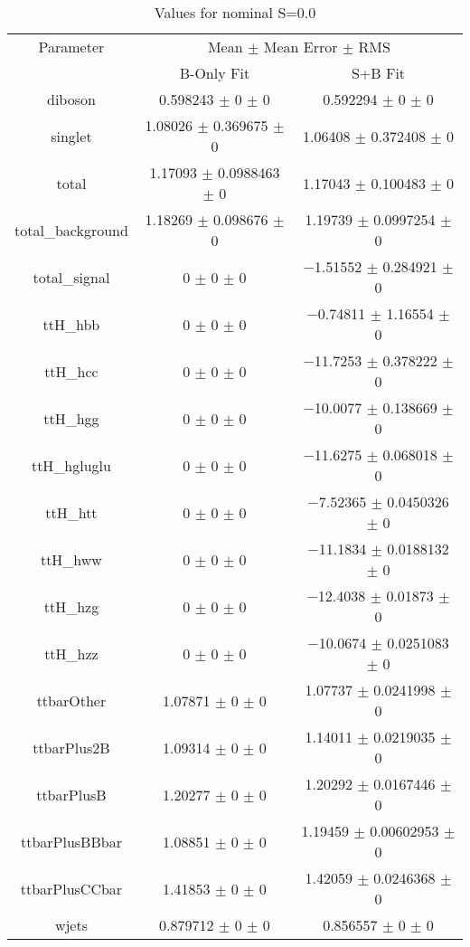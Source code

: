 \begin{table}
\centering
\caption{Values for nominal S=0.0}
\begin{tabular}{ccc}
\toprule
Parameter & \multicolumn{2}{c}{Mean $\pm$ Mean Error $\pm$ RMS}\\
 & B-Only Fit & S+B Fit\\
\midrule
diboson & \num{0.598243} $\pm$ \num{0} $\pm$ \num{0} & \num{0.592294} $\pm$ \num{0} $\pm$ \num{0}\\
singlet & \num{1.08026} $\pm$ \num{0.369675} $\pm$ \num{0} & \num{1.06408} $\pm$ \num{0.372408} $\pm$ \num{0}\\
total & \num{1.17093} $\pm$ \num{0.0988463} $\pm$ \num{0} & \num{1.17043} $\pm$ \num{0.100483} $\pm$ \num{0}\\
total\_background & \num{1.18269} $\pm$ \num{0.098676} $\pm$ \num{0} & \num{1.19739} $\pm$ \num{0.0997254} $\pm$ \num{0}\\
total\_signal & \num{0} $\pm$ \num{0} $\pm$ \num{0} & \num{-1.51552} $\pm$ \num{0.284921} $\pm$ \num{0}\\
ttH\_hbb & \num{0} $\pm$ \num{0} $\pm$ \num{0} & \num{-0.74811} $\pm$ \num{1.16554} $\pm$ \num{0}\\
ttH\_hcc & \num{0} $\pm$ \num{0} $\pm$ \num{0} & \num{-11.7253} $\pm$ \num{0.378222} $\pm$ \num{0}\\
ttH\_hgg & \num{0} $\pm$ \num{0} $\pm$ \num{0} & \num{-10.0077} $\pm$ \num{0.138669} $\pm$ \num{0}\\
ttH\_hgluglu & \num{0} $\pm$ \num{0} $\pm$ \num{0} & \num{-11.6275} $\pm$ \num{0.068018} $\pm$ \num{0}\\
ttH\_htt & \num{0} $\pm$ \num{0} $\pm$ \num{0} & \num{-7.52365} $\pm$ \num{0.0450326} $\pm$ \num{0}\\
ttH\_hww & \num{0} $\pm$ \num{0} $\pm$ \num{0} & \num{-11.1834} $\pm$ \num{0.0188132} $\pm$ \num{0}\\
ttH\_hzg & \num{0} $\pm$ \num{0} $\pm$ \num{0} & \num{-12.4038} $\pm$ \num{0.01873} $\pm$ \num{0}\\
ttH\_hzz & \num{0} $\pm$ \num{0} $\pm$ \num{0} & \num{-10.0674} $\pm$ \num{0.0251083} $\pm$ \num{0}\\
ttbarOther & \num{1.07871} $\pm$ \num{0} $\pm$ \num{0} & \num{1.07737} $\pm$ \num{0.0241998} $\pm$ \num{0}\\
ttbarPlus2B & \num{1.09314} $\pm$ \num{0} $\pm$ \num{0} & \num{1.14011} $\pm$ \num{0.0219035} $\pm$ \num{0}\\
ttbarPlusB & \num{1.20277} $\pm$ \num{0} $\pm$ \num{0} & \num{1.20292} $\pm$ \num{0.0167446} $\pm$ \num{0}\\
ttbarPlusBBbar & \num{1.08851} $\pm$ \num{0} $\pm$ \num{0} & \num{1.19459} $\pm$ \num{0.00602953} $\pm$ \num{0}\\
ttbarPlusCCbar & \num{1.41853} $\pm$ \num{0} $\pm$ \num{0} & \num{1.42059} $\pm$ \num{0.0246368} $\pm$ \num{0}\\
wjets & \num{0.879712} $\pm$ \num{0} $\pm$ \num{0} & \num{0.856557} $\pm$ \num{0} $\pm$ \num{0}\\
\bottomrule
\end{tabular}
\end{table}